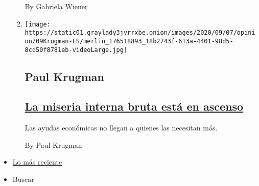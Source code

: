 \begin{enumerate}
\begin{enumerate}
    By Gabriela Wiener
  \item
    \texttt{[image: https://static01.graylady3jvrrxbe.onion/images/2020/09/07/opinion/09Krugman-ES/merlin\_176518893\_18b2743f-613a-4401-98d5-8cd50f8781eb-videoLarge.jpg]}

    \hypertarget{paul-krugman}{%
    \subsection{Paul Krugman}\label{paul-krugman}}

    \hypertarget{la-miseria-interna-bruta-estuxe1-en-ascenso}{%
    \subsection{\texorpdfstring{\href{/es/2020/09/09/espanol/opinion/trump-empleo-economia.html}{La
    miseria interna bruta está en
    ascenso}}{La miseria interna bruta está en ascenso}}\label{la-miseria-interna-bruta-estuxe1-en-ascenso}}

    Las ayudas económicas no llegan a quienes las necesitan más.

    By Paul Krugman
  \end{enumerate}
\end{enumerate}

\begin{itemize}
\tightlist
\item
  \protect\hyperlink{stream-panel}{Lo más reciente}
\item
  Buscar
\end{itemize}

